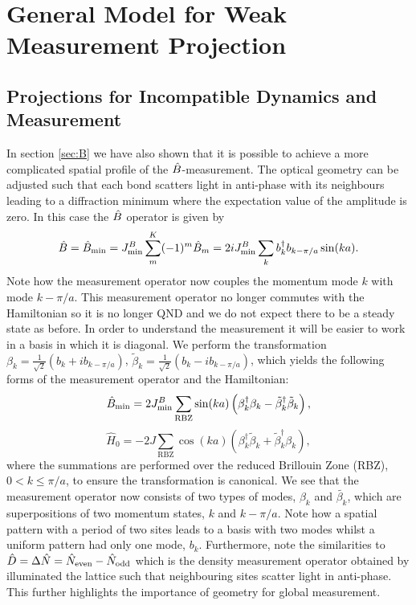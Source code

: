 \section{General Model for Weak Measurement Projection}

\subsection{Projections for Incompatible Dynamics and Measurement}

In section \ref{sec:B} we have also shown that it is possible to
achieve a more complicated spatial profile of the
$\hat{B}$-measurement. The optical geometry can be adjusted such that each
bond scatters light in anti-phase with its neighbours leading to a
diffraction minimum where the expectation value of the amplitude is
zero. In this case the $\hat{B}$ operator is given by
\begin{equation}
  \hat{B} = \hat{B}_\mathrm{min} = J^B_\mathrm{min} \sum_m^K (-1)^m \hat{B}_m
  = 2 i J^B_\mathrm{min} \sum_k b^\dagger_k b_{k - \pi/a} \sin(ka).
\end{equation}
Note how the measurement operator now couples the momentum mode $k$
with mode $k - \pi/a$. This measurement operator no longer commutes
with the Hamiltonian so it is no longer QND and we do not expect there
to be a steady state as before. In order to understand the measurement
it will be easier to work in a basis in which it is diagonal. We
perform the transformation
$\beta_k = \frac{1}{\sqrt{2}} \left( b_k + i b_{k - \pi/a} \right)$,
$\tilde{\beta}_k = \frac{1}{\sqrt{2}} \left( b_k - i b_{k - \pi/a}
\right)$, which yields the following forms of the measurement operator
and the Hamiltonian:
\begin{equation}
  \label{eq:BminBeta}
  \hat{B}_\mathrm{min} = 2 J^B_\mathrm{min} \sum_{\mathrm{RBZ}} \sin(ka) \left( \beta^\dagger_k
    \beta_k - \tilde{\beta}_k^\dagger \tilde{\beta}_k \right),
\end{equation}
\begin{equation}
  \label{eq:H0Beta}
  \hat{H}_0 = - 2 J \sum_{\mathrm{RBZ}} \cos(ka) \left( \beta_k^\dagger
    \tilde{\beta}_k + \tilde{\beta}^\dagger_k \beta_k \right),
\end{equation}
where the summations are performed over the reduced Brillouin Zone
(RBZ), $0 < k \le \pi/a$, to ensure the transformation is
canonical. We see that the measurement operator now consists of two
types of modes, $\beta_k$ and $\tilde{\beta_k}$, which are
superpositions of two momentum states, $k$ and $k - \pi/a$. Note how a
spatial pattern with a period of two sites leads to a basis with two
modes whilst a uniform pattern had only one mode, $b_k$. Furthermore,
note the similarities to
$\hat{D} = \Delta \hat{N} = \hat{N}_\mathrm{even} - \hat{N}_\mathrm{odd}$
which is the density measurement operator obtained by illuminated the
lattice such that neighbouring sites scatter light in anti-phase. This
further highlights the importance of geometry for global measurement.

